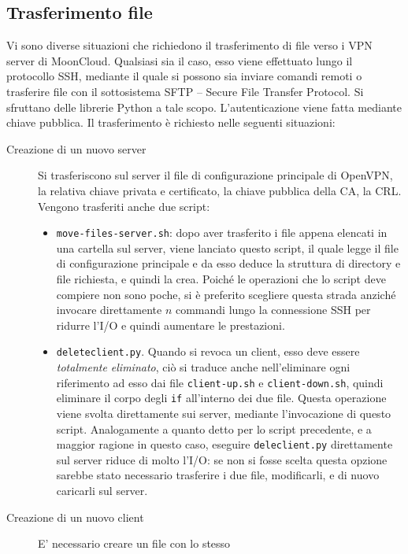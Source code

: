 \subsection{Trasferimento file}
Vi sono diverse situazioni che richiedono il trasferimento di file
verso i VPN server di MoonCloud. Qualsiasi sia il caso, esso viene effettuato
lungo il protocollo SSH, mediante il quale si possono sia inviare comandi remoti
o trasferire file con il sottosistema SFTP -- Secure File Transfer Protocol. Si sfruttano
delle librerie Python a tale scopo. L'autenticazione viene fatta mediante chiave
pubblica.
Il trasferimento è richiesto nelle seguenti situazioni:
\begin{description}
	\item[Creazione di un nuovo server]Si trasferiscono sul server il file
	di configurazione principale di OpenVPN, la relativa chiave privata e certificato,
	la chiave pubblica della CA, la CRL.
	Vengono trasferiti anche due script:
	\begin{itemize}
		\item \texttt{move-files-server.sh}: dopo aver trasferito i file appena elencati
		      in una cartella sul server, viene lanciato questo script, il quale legge il file
		      di configurazione principale e da esso deduce la struttura di directory e file
		      richiesta, e quindi la crea.
		      Poiché le operazioni che lo script deve compiere non sono poche, si è
		      preferito scegliere questa strada anziché invocare direttamente $n$ commandi 
		      lungo la connessione SSH per ridurre l'I/O e quindi aumentare le prestazioni.
		\item \texttt{deleteclient.py}. Quando si revoca un client, esso deve essere
		      \textit{totalmente eliminato}, ciò si traduce anche nell'eliminare ogni riferimento
		      ad esso dai file \texttt{client-up.sh} e \texttt{client-down.sh}, quindi eliminare
		      il corpo degli \texttt{if} all'interno dei due file. Questa operazione viene
		      svolta direttamente sui server, mediante l'invocazione di questo script.
		      Analogamente a quanto detto per lo script precedente, e a maggior ragione in questo
		      caso, eseguire \texttt{deleclient.py} direttamente sul server riduce di molto l'I/O:
		      se non si fosse scelta questa opzione sarebbe stato necessario trasferire i due file,
		      modificarli, e di nuovo caricarli sul server.
	\end{itemize}
	\item[Creazione di un nuovo client]E' necessario creare un file con lo stesso

\end{description}
